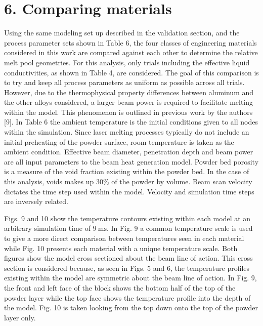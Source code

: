 \documentclass[10pt]{article}
\begin{document}
\section*{6. Comparing materials}
Using the same modeling set up described in the validation section, and the process parameter sets shown in Table 6, the four classes of engineering materials considered in this work are compared against each other to determine the relative melt pool geometries. For this analysis, only trials including the effective liquid conductivities, as shown in Table 4, are considered. The goal of this comparison is to try and keep all process parameters as uniform as possible across all trials. However, due to the thermophysical property differences between aluminum and the other alloys considered, a larger beam power is required to facilitate melting within the model. This phenomenon is outlined in previous work by the authors [9]. In Table 6 the ambient temperature is the initial conditions given to all nodes within the simulation. Since laser melting processes typically do not include an initial preheating of the powder surface, room temperature is taken as the ambient condition. Effective beam diameter, penetration depth and beam power are all input parameters to the beam heat generation model. Powder bed porosity is a measure of the void fraction existing within the powder bed. In the case of this analysis, voids makes up $30 \%$ of the powder by volume. Beam scan velocity dictates the time step used within the model. Velocity and simulation time steps are inversely related.

Figs. 9 and 10 show the temperature contours existing within each model at an arbitrary simulation time of $9 \mathrm{~ms}$. In Fig. 9 a common temperature scale is used to give a more direct comparison between temperatures seen in each material while Fig. 10 presents each material with a unique temperature scale. Both figures show the model cross sectioned about the beam line of action. This cross section is considered because, as seen in Figs. 5 and 6, the temperature profiles existing within the model are symmetric about the beam line of action. In Fig. 9, the front and left face of the block shows the bottom half of the top of the powder layer while the top face shows the temperature profile into the depth of the model. Fig. 10 is taken looking from the top down onto the top of the powder layer only.
\end{document}
